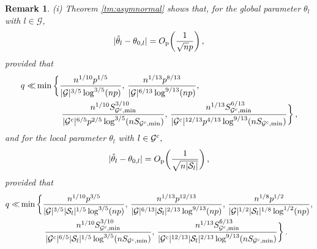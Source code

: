 \documentclass[12pt]{article}
\newtheorem{remark}{Remark}
\newcommand{\btc}{{\rm c}}
\newcommand{\0}{{\bf 0}}
\begin{document}
\begin{remark} \label{rmk6}
{\rm(i)} Theorem {\rm\ref{tm:asymnormal}} shows that, for the global parameter $\theta_{l}$ with $l \in \mathcal{G}$,
    \begin{align*}
        |\hat{\theta}_l-\theta_{0,l}| = O_{\rm p}\bigg(\frac{1}{\sqrt{n}p}\bigg)\,,
     \end{align*}   
provided that  
 \begin{align*}
     q\ll &\min\bigg\{\frac{n^{1/10}p^{1/5}}{|\mathcal{G}|^{3/5}\log^{3/5}(np)},\,\frac{n^{1/13}p^{8/13}}{|\mathcal{G}|^{6/13}\log^{9/13}(np)},
\\&~~~~~~~~~
\frac{n^{1/10}S_{\mathcal{G}^{\btc},\min}^{3/10}}{|\mathcal{G}^{\btc}|^{6/5}p^{2/5}\log^{3/5}(nS_{\mathcal{G}^{\btc},\min})},\,\frac{n^{1/13}S_{\mathcal{G}^{\btc},\min}^{6/13}}{|\mathcal{G}^{\btc}|^{12/13}p^{4/13}\log^{9/13}(nS_{\mathcal{G}^{\btc},\min})}\bigg\}\,,
 \end{align*}
 and for the local parameter $\theta_l$ with $l \in \mathcal{G}^{\btc},$
        \begin{align*}
         |\hat{\theta}_l-\theta_{0,l}| = O_{\rm p}\bigg(\frac{1}{\sqrt{n |\mathcal{S}_l|}}\bigg)\,, 
         \end{align*}
  provided that 
  \begin{align*}
     q\ll &\min\bigg\{\frac{n^{1/10}p^{3/5}}{|\mathcal{G}|^{3/5}|\mathcal{S}_l|^{1/5}\log^{3/5}(np)},\,\frac{n^{1/13}p^{12/13}}{|\mathcal{G}|^{6/13}|\mathcal{S}_l|^{2/13}\log^{9/13}(np)},\,
\frac{n^{1/8}p^{1/2}}{|\mathcal{G}|^{1/2}|\mathcal{S}_l|^{1/8}\log^{1/2}(np)},
\\&~~~~~~~~~
\frac{n^{1/10}S_{\mathcal{G}^{\btc},\min}^{3/10}}{|\mathcal{G}^{\btc}|^{6/5}|\mathcal{S}_l|^{1/5}\log^{3/5}(nS_{\mathcal{G}^{\btc},\min})},\,\frac{n^{1/13}S_{\mathcal{G}^{\btc},\min}^{6/13}}{|\mathcal{G}^{\btc}|^{12/13}|\mathcal{S}_l|^{2/13}\log^{9/13}(nS_{\mathcal{G}^{\btc},\min})}\bigg\}\,.

\end{align*}
\end{remark}
\end{document}
